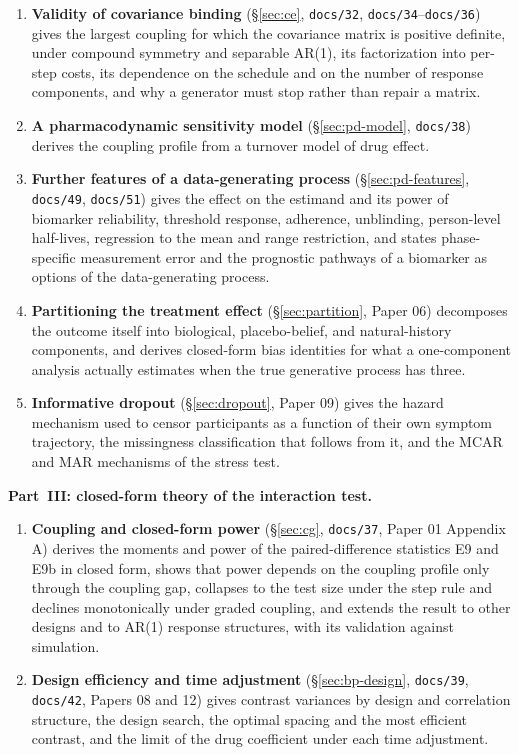 \documentclass[11pt]{article}
\newcommand{\code}[1]{\texttt{#1}}
\begin{document}
\begin{enumerate}[label=\textbf{\arabic*.}, itemsep=2pt, resume]
  are close in their first two moments.
\item \textbf{Validity of covariance binding} (\S\ref{sec:ce},
  \code{docs/32}, \code{docs/34}--\code{docs/36}) gives the largest
  coupling for which the covariance matrix is positive definite, under
  compound symmetry and separable AR(1), its factorization into
  per-step costs, its dependence on the schedule and on the number of
  response components, and why a generator must stop rather than
  repair a matrix.
\item \textbf{A pharmacodynamic sensitivity model}
  (\S\ref{sec:pd-model}, \code{docs/38}) derives the coupling profile
  from a turnover model of drug effect.
\item \textbf{Further features of a data-generating process}
  (\S\ref{sec:pd-features}, \code{docs/49}, \code{docs/51}) gives the
  effect on the estimand and its power of biomarker reliability,
  threshold response, adherence, unblinding, person-level half-lives,
  regression to the mean and range restriction, and states
  phase-specific measurement error and the prognostic pathways of a
  biomarker as options of the data-generating process.
\item \textbf{Partitioning the treatment effect}
  (\S\ref{sec:partition}, Paper 06) decomposes the outcome itself into
  biological, placebo-belief, and natural-history components, and
  derives closed-form bias identities for what a one-component
  analysis actually estimates when the true generative process has
  three.
\item \textbf{Informative dropout} (\S\ref{sec:dropout}, Paper 09)
  gives the hazard mechanism used to censor participants as a function
  of their own symptom trajectory, the missingness classification
  that follows from it, and the MCAR and MAR mechanisms of the stress
  test.
\end{enumerate}

\noindent\textbf{Part~III: closed-form theory of the interaction test.}
\begin{enumerate}[label=\textbf{\arabic*.}, itemsep=2pt, resume]
\item \textbf{Coupling and closed-form power} (\S\ref{sec:cg},
  \code{docs/37}, Paper 01 Appendix A) derives the moments and power of
  the paired-difference statistics E9 and E9b in closed form, shows
  that power depends on the coupling profile only through the coupling
  gap, collapses to the test size under the step rule and declines
  monotonically under graded coupling, and extends the result to other
  designs and to AR(1) response structures, with its validation against
  simulation.
\item \textbf{Design efficiency and time adjustment}
  (\S\ref{sec:bp-design}, \code{docs/39}, \code{docs/42}, Papers 08
  and 12) gives contrast variances by design and correlation structure,
  the design search, the optimal spacing and the most efficient
  contrast, and the limit of the drug coefficient under each time
  adjustment.
\end{enumerate}
\end{document}
